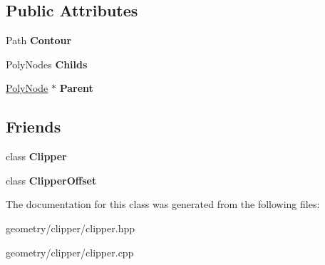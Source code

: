 \subsection*{Public Attributes}
\begin{DoxyCompactItemize}
\item 
\mbox{\label{class_clipper_lib_1_1_poly_node_a1d08b8a9499ff8cb89d5d63a12f881ea}} 
Path {\bfseries Contour}
\item 
\mbox{\label{class_clipper_lib_1_1_poly_node_a7ac59aea508951a4c979bfca8913261d}} 
Poly\+Nodes {\bfseries Childs}
\item 
\mbox{\label{class_clipper_lib_1_1_poly_node_a9465bc02623316de2af3ab52c6f7041e}} 
\mbox{\hyperlink{class_clipper_lib_1_1_poly_node}{Poly\+Node}} $\ast$ {\bfseries Parent}
\end{DoxyCompactItemize}
\subsection*{Friends}
\begin{DoxyCompactItemize}
\item 
\mbox{\label{class_clipper_lib_1_1_poly_node_a4d39a09ecdddeeb85930dd4554a54b3c}} 
class {\bfseries Clipper}
\item 
\mbox{\label{class_clipper_lib_1_1_poly_node_adadfb8ac9a17a5c8fb7b4f012075b975}} 
class {\bfseries Clipper\+Offset}
\end{DoxyCompactItemize}


The documentation for this class was generated from the following files\+:\begin{DoxyCompactItemize}
\item 
geometry/clipper/clipper.\+hpp\item 
geometry/clipper/clipper.\+cpp\end{DoxyCompactItemize}
